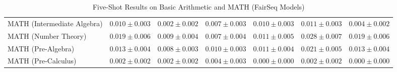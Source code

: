 \documentclass[11pt]{article}
\begin{document}
{\begin{landscape}
\begin{table}
\begin{tabular}{l c c c c c c }
MATH (Intermediate Algebra) & $0.010 \pm 0.003$ & $0.002 \pm 0.002$ & $0.007 \pm 0.003$ & $0.010 \pm 0.003$ & $0.011 \pm 0.003$ & $0.004 \pm 0.002$ \\ 
MATH (Number Theory) & $0.019 \pm 0.006$ & $0.009 \pm 0.004$ & $0.007 \pm 0.004$ & $0.011 \pm 0.005$ & $0.028 \pm 0.007$ & $0.019 \pm 0.006$ \\ 
MATH (Pre-Algebra) & $0.013 \pm 0.004$ & $0.008 \pm 0.003$ & $0.010 \pm 0.003$ & $0.011 \pm 0.004$ & $0.021 \pm 0.005$ & $0.013 \pm 0.004$ \\ 
MATH (Pre-Calculus) & $0.002 \pm 0.002$ & $0.002 \pm 0.002$ & $0.004 \pm 0.003$ & $0.000 \pm 0.000$ & $0.002 \pm 0.002$ & $0.000 \pm 0.000$ \\ 
\bottomrule 
\end{tabular}
\caption{Five-Shot Results on Basic Arithmetic and MATH (FairSeq Models)}
\label{tab:math_fairseq_5}
\end{table}
\end{landscape}}


\end{document}
